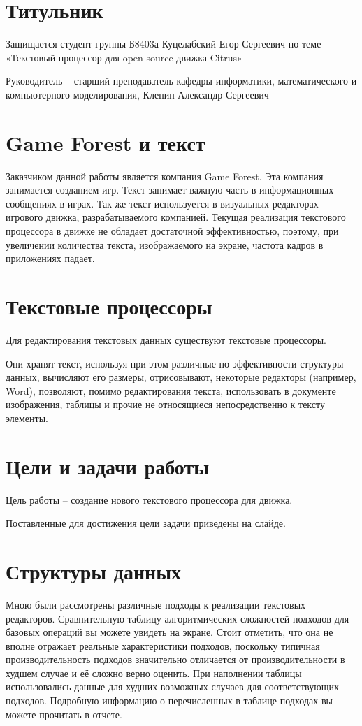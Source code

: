 \documentclass{article}
\begin{document}
    \section{Титульник}
        \par Защищается студент группы Б8403а Куцелабский Егор Сергеевич по теме «Текстовый 
        процессор для open-source движка Citrus»
        \par Руководитель – старший преподаватель кафедры информатики, математического и 
        компьютерного моделирования, Кленин Александр Сергеевич
    \section{Game Forest и текст}
        \par Заказчиком данной работы является компания Game Forest. Эта компания занимается созданием игр. Текст занимает важную часть в 
        информационных сообщениях в играх. Так же текст используется в визуальных редакторах 
        игрового движка, разрабатываемого компанией. Текущая реализация текстового процессора в 
        движке не обладает достаточной эффективностью, поэтому, при увеличении количества 
        текста, изображаемого на экране, частота кадров в приложениях падает. 
    \section{Текстовые процессоры}
        \par Для  редактирования текстовых данных существуют текстовые процессоры.
        \par Они хранят текст, используя при этом различные по эффективности структуры данных, 
        вычисляют его размеры, отрисовывают, некоторые редакторы (например, Word), позволяют, 
        помимо редактирования текста, использовать в документе изображения, таблицы и прочие не 
        относящиеся непосредственно к тексту элементы.
    \section{Цели и задачи работы}
        \par Цель работы – создание нового текстового процессора для движка.
        \par Поставленные для достижения цели задачи приведены на слайде.
    \section{Структуры данных}
        \par Мною были рассмотрены различные подходы к реализации текстовых редакторов. 
        Сравнительную таблицу алгоритмических сложностей подходов для базовых операций вы 
        можете увидеть на экране. Стоит отметить, что она не вполне отражает реальные 
        характеристики подходов, поскольку типичная производительность подходов значительно 
        отличается от производительности в худшем случае и её сложно верно оценить. При 
        наполнении таблицы использовались данные для худших возможных случаев для 
        соответствующих подходов. Подробную информацию о перечисленных в таблице подходах вы 
        можете прочитать в отчете.
\end{document}
